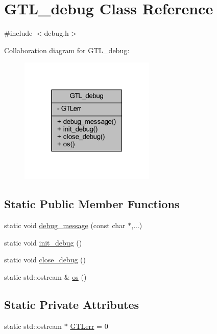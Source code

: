 \hypertarget{class_g_t_l__debug}{}\section{G\+T\+L\+\_\+debug Class Reference}
\label{class_g_t_l__debug}


{\ttfamily \#include $<$debug.\+h$>$}



Collaboration diagram for G\+T\+L\+\_\+debug\+:\nopagebreak
\begin{figure}[H]
\begin{center}
\leavevmode
\includegraphics[width=183pt]{class_g_t_l__debug__coll__graph}
\end{center}
\end{figure}
\subsection*{Static Public Member Functions}
\begin{DoxyCompactItemize}
\item 
static void \mbox{\hyperlink{class_g_t_l__debug_aca4c2fb24203b5fba5e4ffa9c2fa263f}{debug\+\_\+message}} (const char $\ast$,...)
\item 
static void \mbox{\hyperlink{class_g_t_l__debug_a119223c9000c1639d79d1a14a447c67a}{init\+\_\+debug}} ()
\item 
static void \mbox{\hyperlink{class_g_t_l__debug_a18b39d8b303a59062f86702a01ab6a98}{close\+\_\+debug}} ()
\item 
static std\+::ostream \& \mbox{\hyperlink{class_g_t_l__debug_a40282dee89c7cd8ea6bd02856e6cd73f}{os}} ()
\end{DoxyCompactItemize}
\subsection*{Static Private Attributes}
\begin{DoxyCompactItemize}
\item 
static std\+::ostream $\ast$ \mbox{\hyperlink{class_g_t_l__debug_a342e76e2d4f128a29548aae14172db45}{G\+T\+Lerr}} = 0
\end{DoxyCompactItemize}


